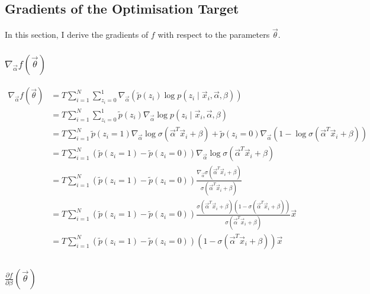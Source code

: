     \subsection{Gradients of the Optimisation Target}

        In this section, I derive the gradients of $f$ with respect to the parameters $\vec \theta$.

        \subsubsection{$\nabla_{\vec \alpha} f(\vec \theta)$}

            \begin{align*}
                \nabla_{\vec \alpha} f(\vec \theta) &= T \sum_{i = 1}^N \sum_{z_i = 0}^1 \nabla_{\vec \alpha} (\tilde p(z_i) \log p(z_i \mid \vec x_i, \vec \alpha, \beta))\\
                    &= T \sum_{i = 1}^N \sum_{z_i = 0}^1 \tilde p(z_i) \nabla_{\vec \alpha} \log p(z_i \mid \vec x_i, \vec \alpha, \beta)\\
                    &= T \sum_{i = 1}^N \tilde p(z_i = 1) \nabla_{\vec \alpha} \log \sigma(\vec \alpha^T \vec x_i + \beta) + \tilde p(z_i = 0) \nabla_{\vec \alpha} (1 - \log \sigma(\vec \alpha^T \vec x_i + \beta))\\
                    &= T \sum_{i = 1}^N (\tilde p(z_i = 1) - \tilde p(z_i = 0)) \nabla_{\vec \alpha} \log \sigma(\vec \alpha^T \vec x_i + \beta)\\
                    &= T \sum_{i = 1}^N (\tilde p(z_i = 1) - \tilde p(z_i = 0)) \frac{\nabla_{\vec \alpha} \sigma(\vec \alpha^T \vec x_i + \beta)}{\sigma(\vec \alpha^T \vec x_i + \beta)}\\
                    &= T \sum_{i = 1}^N (\tilde p(z_i = 1) - \tilde p(z_i = 0)) \frac{\sigma(\vec \alpha^T \vec x_i + \beta)(1 - \sigma(\vec \alpha^T \vec x_i + \beta))}{\sigma(\vec \alpha^T \vec x_i + \beta)} \vec x\\
                    &= T \sum_{i = 1}^N (\tilde p(z_i = 1) - \tilde p(z_i = 0)) (1 - \sigma(\vec \alpha^T \vec x_i + \beta)) \vec x\\
            \end{align*}

        \subsubsection{$\frac{\partial f}{\partial \beta}(\vec \theta)$}
  

